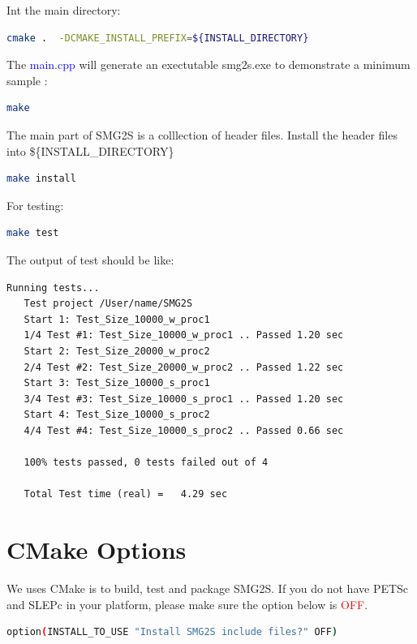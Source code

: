 \documentclass[a4paper, 10 pt]{report}
\begin{document}
	Int the main directory:
	
	\begin{lstlisting}[language=bash,frame=single]
   cmake .  -DCMAKE_INSTALL_PREFIX=${INSTALL_DIRECTORY}
	\end{lstlisting}
	
	The \textcolor{blue}{main.cpp} will generate an exectutable smg2s.exe to demonstrate a minimum sample :

	\begin{lstlisting}[language=bash, frame=single]
   make
	\end{lstlisting}

	The main part of SMG2S is a colllection of header files. Install the header files into \$\{INSTALL\_DIRECTORY\}

	\begin{lstlisting}[language=bash,frame=single]
   make install
	\end{lstlisting}

	For testing:
	
	\begin{lstlisting}[language=bash,frame=single]
   make test
	\end{lstlisting}
	
	The output of test should be like:
\begin{lstlisting}[frame=single]
   Running tests...
   Test project /User/name/SMG2S
   Start 1: Test_Size_10000_w_proc1
   1/4 Test #1: Test_Size_10000_w_proc1 .. Passed 1.20 sec
   Start 2: Test_Size_20000_w_proc2
   2/4 Test #2: Test_Size_20000_w_proc2 .. Passed 1.22 sec
   Start 3: Test_Size_10000_s_proc1
   3/4 Test #3: Test_Size_10000_s_proc1 .. Passed 1.20 sec
   Start 4: Test_Size_10000_s_proc2
   4/4 Test #4: Test_Size_10000_s_proc2 .. Passed 0.66 sec

   100% tests passed, 0 tests failed out of 4

   Total Test time (real) =   4.29 sec
\end{lstlisting}

	\section{CMake Options}
	We uses CMake is to build, test and package SMG2S. If you do not have PETSc and SLEPc in your platform, please make sure the option below is \textcolor{red}{OFF}.
	
	\begin{lstlisting}[language=bash,frame=single]
option(INSTALL_TO_USE "Install SMG2S include files?" OFF)
	\end{lstlisting}
	
\end{document}
